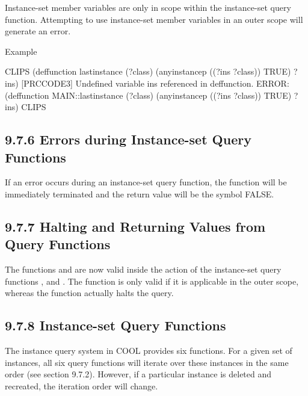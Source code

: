 \documentclass[letterpaper,10pt,english]{sphinxmanual}
\begin{document}
Instance-set member variables are only in scope within the instance-set
query function. Attempting to use instance-set member variables in an
outer scope will generate an error.

Example

\begin{sphinxVerbatim}[commandchars=\\\{\}]
CLIPS\PYGZgt{}
    (deffunction last\PYGZhy{}instance (?class)
      (any\PYGZhy{}instancep ((?ins ?class)) TRUE)
      ?ins)
    [PRCCODE3] Undefined variable ins referenced in deffunction.
    ERROR:
    (deffunction MAIN::last\PYGZhy{}instance
      (?class)
      (any\PYGZhy{}instancep ((?ins ?class))
      TRUE)
      ?ins)
    CLIPS\PYGZgt{}
\end{sphinxVerbatim}


\subsection{9.7.6 Errors during Instance-set Query Functions}
\label{\detokenize{cool:errors-during-instance-set-query-functions}}
If an error occurs during an instance-set query function, the function
will be immediately terminated and the return value will be the symbol
FALSE.


\subsection{9.7.7 Halting and Returning Values from Query Functions}
\label{\detokenize{cool:halting-and-returning-values-from-query-functions}}
The functions  and  are now valid inside the action
of the instance-set query functions ,
 and . The
 function is only valid if it is applicable in the outer
scope, whereas the  function actually halts the query.


\subsection{9.7.8 Instance-set Query Functions}
\label{\detokenize{cool:instance-set-query-functions}}
The instance query system in COOL provides six functions. For a given
set of instances, all six query functions will iterate over these
instances in the same order (see section 9.7.2). However, if a
particular instance is deleted and recreated, the iteration order will
change.
\end{document}
